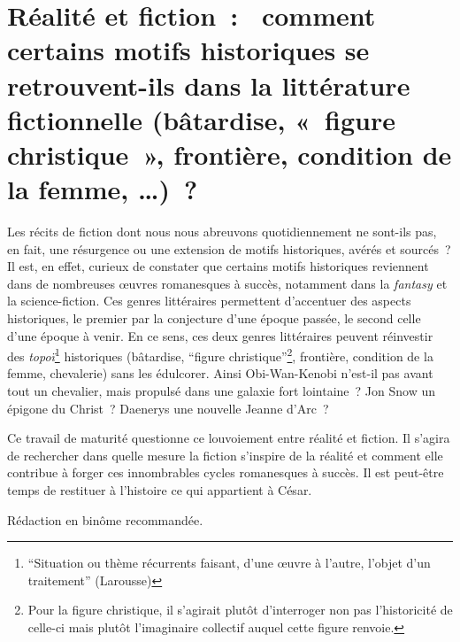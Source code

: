 \documentclass[
  10pt,
  french,
  a5paper,
  openany]{book}
\begin{document}
\hypertarget{ruxe9alituxe9-et-fiction-comment-certains-motifs-historiques-se-retrouvent-ils-dans-la-littuxe9rature-fictionnelle-buxe2tardise-figure-christique-frontiuxe8re-condition-de-la-femme}{%
\chapter{\texorpdfstring{Réalité et fiction~: \linebreak~comment certains motifs historiques se retrouvent-ils dans la littérature fictionnelle (bâtardise, «~figure christique~», frontière, condition de la femme, \ldots)~?}{Réalité et fiction~: ~comment certains motifs historiques se retrouvent-ils dans la littérature fictionnelle (bâtardise, «~figure christique~», frontière, condition de la femme, \ldots)~?}}\label{ruxe9alituxe9-et-fiction-comment-certains-motifs-historiques-se-retrouvent-ils-dans-la-littuxe9rature-fictionnelle-buxe2tardise-figure-christique-frontiuxe8re-condition-de-la-femme}}

Les récits de fiction dont nous nous abreuvons quotidiennement ne sont-ils pas, en fait, une résurgence ou une extension de motifs historiques, avérés et sourcés~? Il est, en effet, curieux de constater que certains motifs historiques reviennent dans de nombreuses œuvres romanesques à succès, notamment dans la \emph{fantasy} et la science-fiction. Ces genres littéraires permettent d'accentuer des aspects historiques, le premier par la conjecture d'une époque passée, le second celle d'une époque à venir. En ce sens, ces deux genres littéraires peuvent réinvestir des \emph{topoï}\footnote{``Situation ou thème récurrents faisant, d'une œuvre à l'autre, l'objet d'un traitement'' (Larousse) } historiques (bâtardise, ``figure christique''\footnote{Pour la figure christique, il s'agirait plutôt d'interroger non pas l'historicité de celle-ci mais plutôt l'imaginaire collectif auquel cette figure renvoie.}, frontière, condition de la femme, chevalerie) sans les édulcorer. Ainsi Obi-Wan-Kenobi n'est-il pas avant tout un chevalier, mais propulsé dans une galaxie fort lointaine~? Jon Snow un épigone du Christ~? Daenerys une nouvelle Jeanne d'Arc~?

Ce travail de maturité questionne ce louvoiement entre réalité et fiction. Il s'agira de rechercher dans quelle mesure la fiction s'inspire de la réalité et comment elle contribue à forger ces innombrables cycles romanesques à succès. Il est peut-être temps de restituer à l'histoire ce qui appartient à César.

Rédaction en binôme recommandée.
\end{document}
